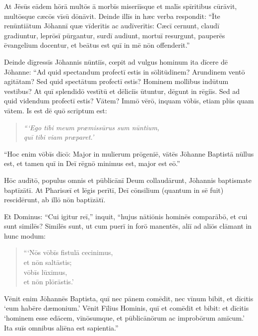 \Versus At Jēsūs eādem hōrā multōs ā morbīs miseriīsque et malīs spīritibus cūrāvit, multōsque cæcōs vīsū dōnāvit.
\Versus Deinde illīs in hæc verba respondit: ``Īte renūntiātum Jōhannī quæ vīderītis ac audīverītis: Cæcī cernunt, claudī gradiuntur, leprōsī pūrgantur, surdī audiunt, mortuī resurgunt, pauperēs ēvangelium docentur,
\Versus et beātus est quī in mē nōn offenderit.''

\Versus Deinde dīgressīs Jōhannis nūntiīs, cœpit ad vulgus hominum ita dīcere dē Jōhanne: ``Ad quid spectandum profectī estis in sōlitūdinem? Arundinem ventō agitātam?
\Versus Sed quid spectātum profectī estis? Hominem mollibus indūtum vestibus? At quī splendidō vestītū et dēliciīs ūtuntur, dēgunt in rēgiīs.
\Versus Sed ad quid videndum profectī estis? Vātem? Immō vērō, inquam vōbīs, etiam plūs quam vātem.
\Versus Is est dē quō scrīptum est:
\begin{verse}
\begin{patverse*}
\emph{``{}`Ego tibi meum præmissūrus sum nūntium,\\
quī tibi viam præparet.'}
\end{patverse*}
\end{verse}

\Versus ``Hoc enim vōbīs dīcō: Major in mulierum prōgeniē, vātēs Jōhanne Baptistā nūllus est, et tamen quī in Deī rēgnō minimus est, major est eō.''

\Versus Hōc audītō, populus omnis et pūblicānī Deum collaudārunt, Jōhannis baptismate baptīzātī.
\Versus At Pharisæī et lēgis perītī, Deī cōnsilium (quantum in sē fuit) rescidērunt, ab illō nōn baptīzātī.

\Versus Et Dominus: ``Cui igitur reī,'' inquit, ``hujus nātiōnis hominēs comparābō, et cui sunt similēs?
\Versus Similēs sunt, ut cum puerī in forō manentēs, aliī ad aliōs clāmant in hunc modum: 
\begin{verse}
\begin{patverse*}
```Nōs vōbīs fistulā cecinimus,\\
et nōn saltāstis;\\
vōbīs lūximus,\\
et nōn plōrāstis.'
\end{patverse*}
\end{verse}
\Versus Vēnit enim Jōhannēs Baptista, quī nec pānem comēdit, nec vīnum bibit, et dīcitis `eum habēre dæmonium.'
\Versus Vēnit Fīlius Hominis, quī et comēdit et bibit: et dīcitis `hominem esse edācem, vīnōsumque, et pūblicānōrum ac improbōrum amīcum.'
\Versus Ita suīs omnibus aliēna est sapientia.''


